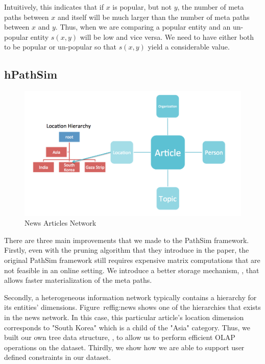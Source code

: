 Intuitively, this indicates that if $x$ is popular, but not $y$, the number of
meta paths between $x$ and itself will be much larger than the number of
meta paths between $x$ and $y$. Thus, when we are comparing a popular entity
and an un-popular entity $s(x,y)$ will be low and vice versa. We need to have
either both to be popular or un-popular so that $s(x,y)$ yield a considerable
value.

\subsection{hPathSim}

\begin{figure}[H]
    \centering
    \includegraphics[width=1.0\linewidth]{./figs/nyt-dataset.png}
    \caption{News Articles Network}
    \label{fig:news}
\end{figure}

There are three main improvements that we made to the PathSim framework.
Firstly, even with the pruning algorithm that they introduce in the paper,
the original PathSim framework still requires expensive matrix computations
that are not feasible in an online setting. We introduce a better storage
mechanism, \mTable, that allows faster materialization of the meta paths.

Secondly, a heterogeneous information network typically contains a hierarchy
for its entities' dimensions. Figure~ref{fig:news} shows one of the hierarchies
that exists in the news network. In this case, this particular article's
location dimension corresponds to "South Korea" which is a child of the "Asia"
category. Thus, we built our own tree data structure, \hTable, to allow us to perform
efficient OLAP operations on the dataset. Thirdly, we show how we are able to
support user defined constraints in our dataset.

